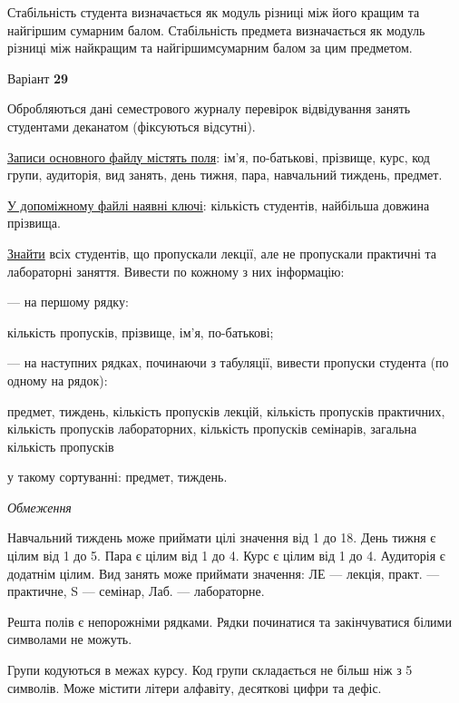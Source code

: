 \documentclass[11pt, ukrainian]{article}
\begin{document}
Стабільність студента визначається як модуль різниці між його кращим та найгіршим сумарним балом.
Стабільність предмета визначається як модуль різниці між найкращим та найгіршимсумарним балом за цим предметом.






\par
\newpage
{\center Варіант  \No \textbf { 29 }\par}
\bigskip
Обробляються дані семестрового журналу перевірок відвідування занять студентами деканатом (фіксуються відсутні). 

\underline{Записи основного файлу містять поля}: ім’я, по-батькові, прізвище, курс, код групи, аудиторія, вид занять, день тижня, пара, навчальний тиждень, предмет.

\underline{У допоміжному файлі наявні ключі}: кількість студентів, найбільша довжина прізвища.

\underline{Знайти} всіх студентів, що пропускали лекції, але не пропускали практичні та лабораторні заняття. Вивести по кожному з них інформацію:\par
{\noindent}--- на першому рядку:\par
кількість пропусків, прізвище, ім’я, по-батькові;

{\noindent}--- на наступних рядках, починаючи з табуляції, вивести пропуски студента (по одному на рядок):\par
предмет, тиждень, кількість пропусків лекцій, кількість пропусків практичних, кількість пропусків лабораторних, кількість пропусків семінарів, загальна кількість пропусків

{\noindent}у такому сортуванні: предмет, тиждень.


\bigskip\textit{Обмеження}

Навчальний тиждень може приймати цілі значення від 1 до 18.
День тижня є цілим від 1 до 5. Пара є цілим від 1 до 4.
Курс є цілим від 1 до 4. Аудиторія є додатнім цілим.
Вид занять може приймати значення:
ЛЕ --- лекція, практ. --- практичне, S --- семінар, Лаб. --- лабораторне.

Решта полів є непорожніми рядками.
Рядки починатися та закінчуватися білими символами не можуть.

Групи кодуються в межах курсу.
Код групи складається не більш ніж з 5 символів.
Може містити літери алфавіту, десяткові цифри та дефіс.
\end{document}
